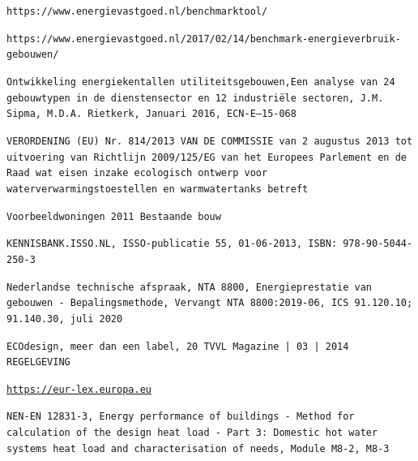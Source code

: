 \documentclass[a4paper,10pt]{article}
\begin{document}
\begin{thebibliography}{9}


\texttt{https://www.energievastgoed.nl/benchmarktool/}


\texttt{https://www.energievastgoed.nl/2017/02/14/benchmark-energieverbruik-gebouwen/}



\texttt{Ontwikkeling energiekentallen utiliteitsgebouwen,Een analyse van 24 gebouwtypen in de dienstensector en 12 industriële sectoren, J.M. Sipma, M.D.A. Rietkerk, Januari 2016, ECN-E--15-068}



\texttt{VERORDENING (EU) Nr. 814/2013 VAN DE COMMISSIE
van 2 augustus 2013
tot uitvoering van Richtlijn 2009/125/EG van het Europees Parlement en de Raad wat eisen inzake
ecologisch ontwerp voor waterverwarmingstoestellen en warmwatertanks betreft}



\texttt{Voorbeeldwoningen 2011 Bestaande bouw}


\texttt{KENNISBANK.ISSO.NL, ISSO-publicatie 55,  01-06-2013, ISBN: 978-90-5044-250-3}


\texttt{Nederlandse technische afspraak, NTA 8800, Energieprestatie van gebouwen - Bepalingsmethode, Vervangt NTA 8800:2019-06, ICS 91.120.10; 91.140.30, juli 2020}



\texttt{ECOdesign, meer dan een
label, 20 TVVL Magazine | 03 | 2014 REGELGEVING}



\texttt{\href{https://eur-lex.europa.eu/legal-content/NL/TXT/HTML/?uri=CELEX:32013R0812&from=EN}{https://eur-lex.europa.eu}}



\texttt{NEN-EN 12831-3, Energy performance of buildings - Method for
calculation of the design heat load - Part 3:
Domestic hot water systems heat load and
characterisation of needs, Module M8-2, M8-3}

\end{thebibliography}
\end{document}
